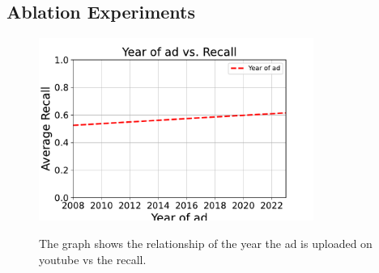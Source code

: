 \FloatBarrier
\subsection{Ablation Experiments}
\begin{figure}[]
    \centering
    \includegraphics[width=0.8\textwidth]{images/year.pdf}
    \label{fig:memorabilityvides}

    \caption{The graph shows the relationship of the year the ad is uploaded on youtube vs the recall. 
    }
    \label{fig:Year}
\end{figure}


